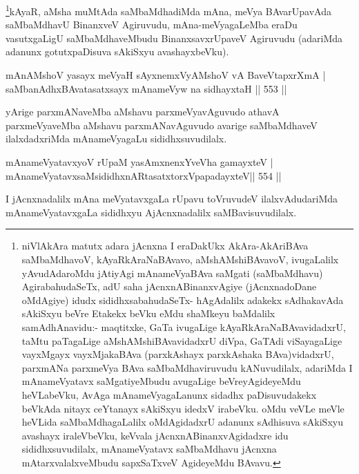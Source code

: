 \begin{artha}
\footnote{niVlAkAra matutx adara jAcnxna I eraDakUkx AkAra-AkAriBAva saMbaMdhavoV, kAyaRkAraNa\-BAvavo, aMshAMshiBAvavoV, ivugaLalilx yAvudAdaroMdu jAtiyAgi mAnameVyaBAva saMgati (saMbaMdhavu) AgirabahudaSeTx, adU saha jAcnxnABinanxvAgiye (jAcnxnadoDane oMdAgiye) idudx sididhxsabahudaSeTx- hAgAdalilx adakekx sAdhakavAda sAkiSxyu beVre Etakekx beVku eMdu shaMkeyu baMdalilx samAdhAnavidu:- maqtitxke, GaTa ivugaLige kAyaRkAraNaBAvavidadxrU, taMtu paTagaLige aMshAMshiBAvavidadxrU diVpa, GaTAdi viSayagaLige vayxMgayx vayxMjakaBAva (parxkAshayx parxkAshaka BAva)vidadxrU, parxmANa parxmeVya BAva saMbaMdhaviruvudu kANuvudilalx, adariMda I mAnameVyatavx saMgatiyeMbudu avugaLige beVreyAgideyeMdu heVLabeVku, AvAga mAnameVyagaLanunx sidadhx paDisuvudakekx beVkAda nitayx ceYtanayx sAkiSxyu idedxV irabeVku. oMdu veVLe meVle heVLida saMbaMdhagaLalilx oMdAgidadxrU adanunx sAdhisuva sAkiSxyu avashayx iraleVbeVku, keVvala jAcnxnABinanxvAgidadxre idu sididhxsuvudilalx, mAnameVyatavx saMbaMdhavu jAcnxna mAtarxvalalxveMbudu sapxSaTxveV AgideyeMdu BAvavu.}kAyaR, aMsha muMtAda saMbaMdhadiMda mAna, meVya BAvarUpa\-vAda saMbaMdhavU BinanxveV Agiruvudu, mAna-meVyagaLeMba eraDu vasutxgaLigU \-saMbaMdhaveMbudu BinanxsavxrUpaveV Agiruvudu (adariMda adanunx gotutx\-paDisuva sAkiSxyu avashayxbeVku).
\end{artha}


\begin{shl}
mAnAMshoV yasayx meVyaH sAyxnemxVyAMshoV vA BaveVtapxrXmA | \\
saMbanAdhxBAvatasatxsayx mAnameVyw na sidhayxtaH \hfill||  553 ||  
\end{shl}

\begin{artha}
yArige parxmANaveMba aMshavu parxmeVyavAguvudo athavA parxmeVyaveMba aMshavu parxmANavAguvudo avarige saMbaMdhaveV ilalxdadxriMda mAnameVyagaLu sididhxsuvudilalx.
\end{artha}

\begin{shl}
mAnameVyatavxyoV rUpaM yasAmxnenxYveVha gamayxteV | \\
mAnameVyatavxsaMsididhxnARtasatxtorxVpapadayxteV\hfill ||  554 ||  
\end{shl}

\begin{artha}
I jAcnxnadalilx mAna meVyatavxgaLa rUpavu toVruvudeV ilalxvAdudariMda mAnameVyatavxgaLa sididhxyu AjAcnxnadalilx saMBavisuvudilalx.
\end{artha}

